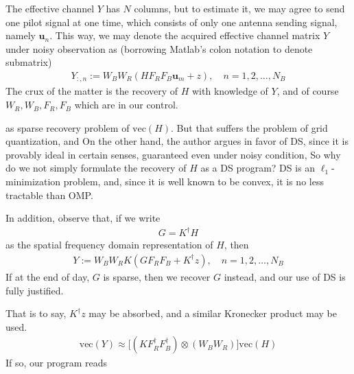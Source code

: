 \documentclass[12pt]{article}
\begin{document}
The effective channel \(Y\) has \(N\) columns, but to estimate it, we may agree to send one pilot signal at one time, which consists of only one antenna sending signal, namely \(\mathbf{u}_n\).
This way, we may denote the acquired effective channel matrix \(Y\) under noisy observation as (borrowing Matlab's colon notation to denote submatrix)
\begin{gather}
Y_{:,n}
:=W_B W_R ( H F_R F_B \mathbf{u}_m +z ), \quad
n =1, 2, \dotsc, N_B
\end{gather}
The crux of the matter is the recovery of \(H\) with knowledge of \(Y\), and of course \(W_R, W_B, F_R, F_B\) which are in our control.


as sparse recovery problem of \(\mathrm{vec}(H)\).
But that suffers the problem of grid quantization, and 
On the other hand, the author argues in favor of DS, since it is provably ideal in certain senses, guaranteed even under noisy condition,
So why do we not simply formulate the recovery of \(H\) as a DS program?
DS is an \(\ell_1\)-minimization problem, and, since it is well known to be convex, it is no less tractable than OMP.

In addition, observe that, if we write
\begin{gather}
G =K^\dagger H
\end{gather}
as the spatial frequency domain representation of \(H\), then
\begin{gather}
Y
:=W_B W_R K ( G F_R F_B +K^\dagger z ), \quad
n =1, 2, \dotsc, N_B
\end{gather}
If at the end of day, \(G\) is sparse, then we recover \(G\) instead, and our use of DS is fully justified.

That is to say, \(K^\dagger z\) may be absorbed, and a similar Kronecker product may be used.
\begin{gather}
\mathrm{vec}(Y)
\approx \big[ (K F_R^\dagger F_B^\dagger) \otimes (W_B W_R) \big] \mathrm{vec}(H)
\end{gather}
If so, our program reads
\end{document}

